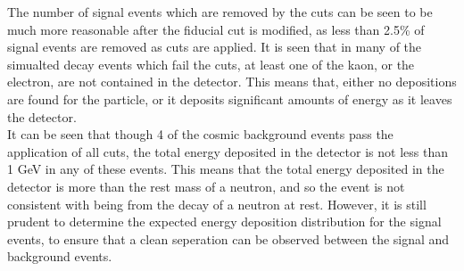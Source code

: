 The number of signal events which are removed by the cuts can be seen to be much more reasonable after the fiducial cut is modified, as less than 2.5\% of signal events are removed as cuts are applied. It is seen that in many of the simualted decay events which fail the cuts, at least one of the kaon, or the electron, are not contained in the detector. This means that, either no depositions are found for the particle, or it deposits significant amounts of energy as it leaves the detector. \\

It can be seen that though 4 of the cosmic background events pass the application of all cuts, the total energy deposited in the detector is not less than 1 GeV in any of these events. This means that the total energy deposited in the detector is more than the rest mass of a neutron, and so the event is not consistent with being from the decay of a neutron at rest. However, it is still prudent to determine the expected energy deposition distribution for the signal events, to ensure that a clean seperation can be observed between the signal and background events.  \\

